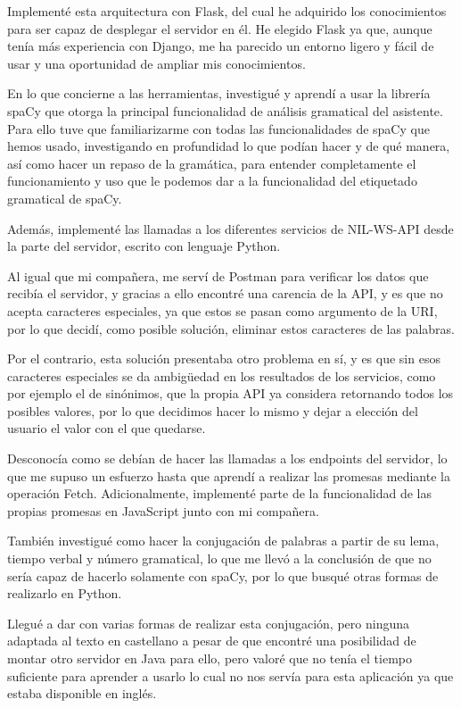 Implementé esta arquitectura con Flask, del cual he adquirido los conocimientos para ser capaz de desplegar el servidor en él. He elegido Flask ya que, aunque tenía más experiencia con Django, me ha parecido un entorno ligero y fácil de usar y una oportunidad de ampliar mis conocimientos.

En lo que concierne a las herramientas, investigué y aprendí a usar la librería spaCy que otorga la principal funcionalidad de análisis gramatical del asistente. Para ello tuve que familiarizarme con todas las funcionalidades de spaCy que hemos usado, investigando en profundidad lo que podían hacer y de qué manera, así como hacer un repaso de la gramática, para entender completamente el funcionamiento y uso que le podemos dar a la funcionalidad del etiquetado gramatical de spaCy.


Además, implementé las llamadas a los diferentes servicios de NIL-WS-API desde la parte del servidor, escrito con lenguaje Python.

Al igual que mi compañera, me serví de Postman para verificar los datos que recibía el servidor, y gracias a ello encontré una carencia de la API, y es que no acepta caracteres especiales, ya que estos se pasan como argumento de la URI, por lo que decidí, como posible solución, eliminar estos caracteres de las palabras.

 Por el contrario, esta solución presentaba otro problema en sí, y es que sin esos caracteres especiales se da ambigüedad en los resultados de los servicios, como por ejemplo el de sinónimos, que la propia API ya considera retornando todos los posibles valores, por lo que decidimos hacer lo mismo y dejar a elección del usuario el valor con el que quedarse.

Desconocía como se debían de hacer las llamadas a los endpoints del servidor, lo que me supuso un esfuerzo hasta que aprendí a realizar las promesas mediante la operación Fetch. Adicionalmente, implementé parte de la funcionalidad de las propias promesas en JavaScript junto con mi compañera.

También investigué como hacer la conjugación de palabras a partir de su lema, tiempo verbal y número gramatical, lo que me llevó a la conclusión de que no sería capaz de hacerlo solamente con spaCy, por lo que busqué otras formas de realizarlo en Python. 

Llegué a dar con varias formas de realizar esta conjugación, pero ninguna adaptada al texto en castellano a pesar de que encontré una posibilidad de montar otro servidor en Java para ello, pero valoré que no tenía el tiempo suficiente para aprender a usarlo lo cual no nos servía para esta aplicación ya que estaba disponible en inglés. 

